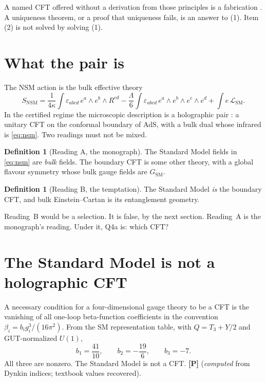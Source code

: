 \documentclass[11pt]{article}
\theoremstyle{definition}
\newtheorem{definition}[theorem]{Definition}
\newcommand{\pP}{\textbf{[P]}}
\begin{document}
A named CFT offered without a derivation from those principles is a
fabrication \cite{McGwierXI}. A uniqueness theorem, or a proof that
uniqueness fails, is an answer to (1). Item (2) is not solved by
solving (1).

\section{What the pair is}

The NSM action is the bulk effective theory
\begin{equation}
S_{\mathrm{NSM}}
=
\frac{1}{4\kappa}
\int\varepsilon_{abcd}\,e^a\wedge e^b\wedge R^{cd}
-
\frac{\Lambda}{6}
\int\varepsilon_{abcd}\,e^a\wedge e^b\wedge e^c\wedge e^d
+
\int e\,\mathcal{L}_{\mathrm{SM}}.
\label{eq:nsm}
\end{equation}
In the certified regime the microscopic description is a
holographic pair \cite{Maldacena1998,Witten1998}: a unitary CFT on
the conformal boundary of AdS, with a bulk dual whose infrared is
\eqref{eq:nsm}. Two readings must not be mixed.

\begin{definition}[Reading A, the monograph]
The Standard Model fields in \eqref{eq:nsm} are \emph{bulk} fields.
The boundary CFT is some other theory, with a global flavour
symmetry whose bulk gauge fields are $G_{\mathrm{SM}}$.
\end{definition}

\begin{definition}[Reading B, the temptation]
The Standard Model \emph{is} the boundary CFT, and bulk Einstein--Cartan
is its entanglement geometry.
\end{definition}

Reading~B would be a selection. It is false, by the next section.
Reading~A is the monograph's reading. Under it, Q4a is: which CFT?

\section{The Standard Model is not a holographic CFT}

A necessary condition for a four-dimensional gauge theory to be a
CFT is the vanishing of all one-loop beta-function coefficients in
the convention $\beta_i=b_i g_i^3/(16\pi^2)$. From the SM
representation table, with $Q=T_3+Y/2$ and GUT-normalized $U(1)$,
\begin{equation}
b_1=\frac{41}{10},
\qquad
b_2=-\frac{19}{6},
\qquad
b_3=-7.
\label{eq:b}
\end{equation}
All three are nonzero. The Standard Model is not a CFT. \pP{}
(\emph{computed} from Dynkin indices; textbook values recovered).
\end{document}
